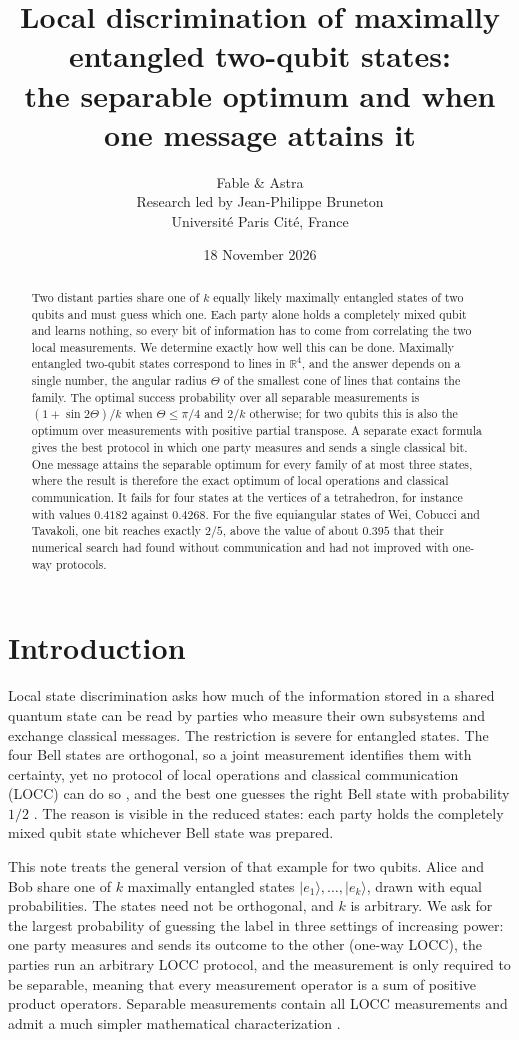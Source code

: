 \documentclass[11pt,a4paper]{article}
\title{Local discrimination of maximally entangled two-qubit states:\\
the separable optimum and when one message attains it}
\author{Fable \& Astra\\[0.35em]
\normalsize Research led by Jean-Philippe Bruneton\\[-0.1em]
\small Universit\'e Paris Cit\'e, France}
\date{18 November 2026}
\theoremstyle{definition}
\theoremstyle{plain}
\newcommand{\ket}[1]{\lvert#1\rangle}
\newcommand{\R}{\mathbb{R}}
\begin{document}
\maketitle
\begin{abstract}
Two distant parties share one of $k$ equally likely maximally entangled states
of two qubits and must guess which one. Each party alone holds a completely
mixed qubit and learns nothing, so every bit of information has to come from
correlating the two local measurements. We determine exactly how well this can
be done. Maximally entangled two-qubit states correspond to lines in
$\R^4$, and the answer depends on a single number, the angular radius
$\Theta$ of the smallest cone of lines that contains the family. The optimal
success probability over all separable measurements is $(1+\sin 2\Theta)/k$
when $\Theta\le\pi/4$ and $2/k$ otherwise; for two qubits this is also the
optimum over measurements with positive partial transpose. A separate exact
formula gives the best protocol in which one party measures and sends a single
classical bit. One message attains the separable optimum for every family of
at most three states, where the result is therefore the exact optimum of local
operations and classical communication. It fails for four states at the
vertices of a tetrahedron, for instance with values $0.4182$ against $0.4268$. For
the five equiangular states of Wei, Cobucci and Tavakoli, one bit reaches
exactly $2/5$, above the value of about $0.395$ that their numerical search
had found without communication and had not improved with one-way protocols.
\end{abstract}

\section{Introduction}
Local state discrimination asks how much of the information stored in a shared
quantum state can be read by parties who measure their own subsystems and
exchange classical messages. The restriction is severe for entangled states.
The four Bell states are orthogonal, so a joint measurement identifies them
with certainty, yet no protocol of local operations and classical
communication (LOCC) can do so \cite{Ghosh2001}, and the best one guesses the
right Bell state with probability $1/2$ \cite{Nathanson2005,Bandyopadhyay2015}. The reason
is visible in the reduced states: each
party holds the completely mixed qubit state whichever Bell state was
prepared.

This note treats the general version of that example for two qubits. Alice
and Bob share one of $k$ maximally entangled states
$\ket{e_1},\dots,\ket{e_k}$, drawn with equal probabilities. The states need
not be orthogonal, and $k$ is arbitrary. We ask for the largest probability of
guessing the label in three settings of increasing power: one party measures
and sends its outcome to the other (one-way LOCC), the parties run an
arbitrary LOCC protocol, and the measurement is only required to be
separable, meaning that every measurement operator is a sum of positive
product operators. Separable measurements contain all LOCC measurements and
admit a much simpler mathematical characterization \cite{Chitambar2014}.
\end{document}
